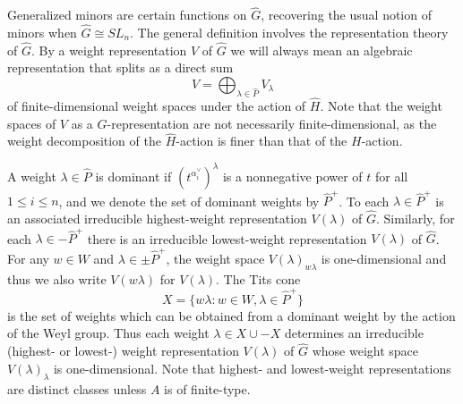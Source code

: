 \documentclass[12pt]{amsart}
\newcommand{\saySS}[1]{\say[SS]{\color{blue}{\bf SS:}\;#1}}
\newcommand{\kk}{\Bbbk}%
\newcommand\onto{\twoheadrightarrow}
\newcommand\into{\hookrightarrow}
\DeclareMathOperator{\Hom}{Hom}
\DeclareMathOperator{\corank}{corank}
\theoremstyle{remark}
\numberwithin{equation}{section}
\numberwithin{figure}{section}
\begin{document}
Generalized minors are certain functions on $\widehat{G}$, recovering the usual notion of minors when $\widehat{G} \cong SL_n$. 
The general definition involves the representation theory of $\widehat{G}$. %
By a weight representation $V$ of $\widehat{G}$ we will always mean an algebraic representation that splits as a direct sum
\[
V = \bigoplus_{\lambda \in \widehat{P}} V_\lambda
\]
of finite-dimensional weight spaces under the action of $\widehat{H}$. Note that the weight spaces of $V$ as a $G$-representation are not necessarily finite-dimensional, as the weight decomposition of the $\widehat{H}$-action is finer than that of the $H$-action. 



A weight $\lambda \in \widehat{P}$ is dominant if $(t^{\alpha_i^\vee})^\lambda$ is a nonnegative power of $t$ for all $1 \leq i \leq n$, and we denote the set of dominant weights by $\widehat{P}^+$. 
To each $\lambda \in \widehat{P}^+$ is an associated irreducible highest-weight representation $V(\lambda)$ of $\widehat{G}$. 
Similarly, for each $\lambda \in -\widehat{P}^+$ there is an irreducible lowest-weight representation $V(\lambda)$ of $\widehat{G}$.
For any $w\in W$ and $\lambda\in\pm\widehat{P}^+$, the weight space $V(\lambda)_{w\lambda}$ is one-dimensional and thus we also write $V(w\lambda)$ for $V(\lambda)$. \saySS{Are these inverted?} 
The Tits cone $$X = \{w\lambda : w \in W, \lambda \in \widehat{P}^+\}$$ is the set of weights which can be obtained from a dominant weight by the action of the Weyl group. 
Thus each weight $\lambda\in X \cup -X$ determines an irreducible (highest- or lowest-) weight representation $V(\lambda)$ of $\widehat{G}$ whose weight space $V(\lambda)_\lambda$ is one-dimensional.
Note that highest- and lowest-weight representations are distinct classes unless $A$ is of finite-type.
\end{document}
